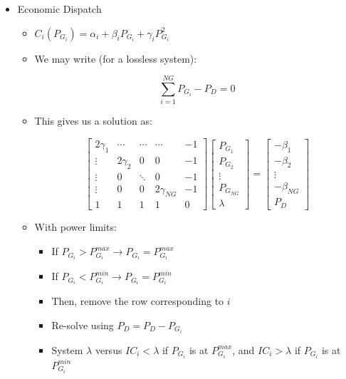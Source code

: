 \begin{itemize}
    \item Economic Dispatch

      \begin{itemize}

        \item $C_i(P_{G_i})=\alpha_i+\beta_iP_{G_i}+\gamma_iP_{G_i}^2$

        \item We may write (for a lossless system):

          $$\sum_{i=1}^{NG}P_{G_i}-P_D=0$$

        \item This gives us a solution as:

          $$\left[ \begin{matrix} 2\gamma_1 & \cdots & \cdots & \cdots & -1\\ \vdots & 2\gamma_2 & 0 & 0 & -1\\ \vdots & 0 & \ddots & 0 & -1\\ \vdots & 0 & 0 & 2\gamma_{NG} & -1\\ 1 & 1 & 1 & 1 &0\end{matrix} \right]\left[ \begin{matrix} P_{G_1}\\ P_{G_2}\\ \vdots \\ P_{G_{NG}}\\ \lambda \end{matrix}\right]=\left[ \begin{matrix} -\beta_1\\-\beta_2\\\vdots\\ -\beta_{NG}\\P_D\end{matrix} \right]$$

        \item With power limits:

          \begin{itemize}

            \item If $P_{G_i}>P_{G_i}^{max}\to P_{G_i}=P_{G_i}^{max}$ 

            \item If $P_{G_i}<P_{G_i}^{min}\to P_{G_i}=P_{G_i}^{min}$ 

            \item Then, remove the row corresponding to $i$

            \item Re-solve using $P_D=P_D-P_{G_i}$

            \item System $\lambda$ versus $IC_i<\lambda$ if $P_{G_i}$ is at $P_{G_i}^{max}$, and $IC_{i}>\lambda$ if $P_{G_i}$ is at $P_{G_i}^{min}$

          \end{itemize}

      \end{itemize}
      
\end{itemize}



